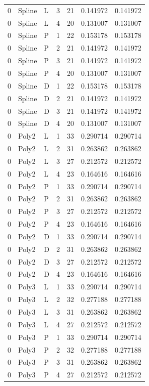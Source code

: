 \begin{longtable}{lllrrrr}
0 & Spline & L & 3 & 21 & 0.141972 & 0.141972 \\
0 & Spline & L & 4 & 20 & 0.131007 & 0.131007 \\
0 & Spline & P & 1 & 22 & 0.153178 & 0.153178 \\
0 & Spline & P & 2 & 21 & 0.141972 & 0.141972 \\
0 & Spline & P & 3 & 21 & 0.141972 & 0.141972 \\
0 & Spline & P & 4 & 20 & 0.131007 & 0.131007 \\
0 & Spline & D & 1 & 22 & 0.153178 & 0.153178 \\
0 & Spline & D & 2 & 21 & 0.141972 & 0.141972 \\
0 & Spline & D & 3 & 21 & 0.141972 & 0.141972 \\
0 & Spline & D & 4 & 20 & 0.131007 & 0.131007 \\
0 & Poly2 & L & 1 & 33 & 0.290714 & 0.290714 \\
0 & Poly2 & L & 2 & 31 & 0.263862 & 0.263862 \\
0 & Poly2 & L & 3 & 27 & 0.212572 & 0.212572 \\
0 & Poly2 & L & 4 & 23 & 0.164616 & 0.164616 \\
0 & Poly2 & P & 1 & 33 & 0.290714 & 0.290714 \\
0 & Poly2 & P & 2 & 31 & 0.263862 & 0.263862 \\
0 & Poly2 & P & 3 & 27 & 0.212572 & 0.212572 \\
0 & Poly2 & P & 4 & 23 & 0.164616 & 0.164616 \\
0 & Poly2 & D & 1 & 33 & 0.290714 & 0.290714 \\
0 & Poly2 & D & 2 & 31 & 0.263862 & 0.263862 \\
0 & Poly2 & D & 3 & 27 & 0.212572 & 0.212572 \\
0 & Poly2 & D & 4 & 23 & 0.164616 & 0.164616 \\
0 & Poly3 & L & 1 & 33 & 0.290714 & 0.290714 \\
0 & Poly3 & L & 2 & 32 & 0.277188 & 0.277188 \\
0 & Poly3 & L & 3 & 31 & 0.263862 & 0.263862 \\
0 & Poly3 & L & 4 & 27 & 0.212572 & 0.212572 \\
0 & Poly3 & P & 1 & 33 & 0.290714 & 0.290714 \\
0 & Poly3 & P & 2 & 32 & 0.277188 & 0.277188 \\
0 & Poly3 & P & 3 & 31 & 0.263862 & 0.263862 \\
0 & Poly3 & P & 4 & 27 & 0.212572 & 0.212572 \\

\end{longtable}
